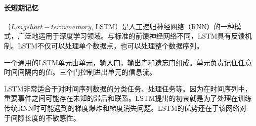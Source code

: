 
\paragraph{长短期记忆}\cite{ wiki:LSTM}（$Long short-term memory$, LSTM）是人工递归神经网络（RNN）的一种模式，广泛地运用于深度学习领域。与标准的前馈神经网络不同，LSTM具有反馈机制。LSTM不仅可以处理单个数据点，也可以处理整个数据序列。

一个通用的LSTM单元由单元，输入门，输出门和遗忘门组成。单元负责记住任意时间间隔内的值。三个门控制进出单元的信息流。

LSTM非常适合于对时间序列数据的分类任务、处理任务等。因为在时间序列中，重要事件之间可能存在未知的滞后和联系。LSTM提出的初衷就是为了处理在训练传统RNN时可能遇到的梯度爆炸和梯度消失问题。LSTM的优势还在于该网络对于间隙长度的不敏感性。

